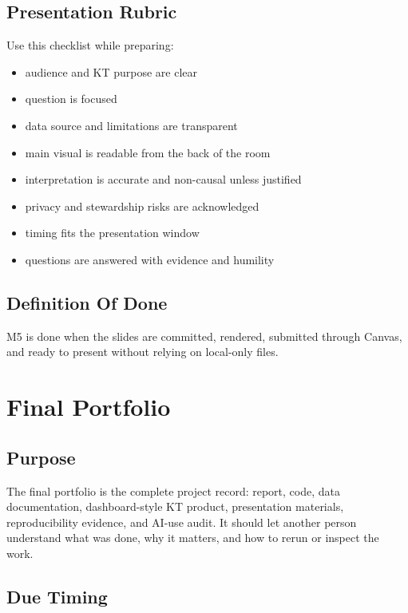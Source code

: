 \documentclass[
  letterpaper,
  DIV=11,
  numbers=noendperiod,
  oneside]{scrreprt}
\providecommand{\tightlist}{%
  \setlength{\itemsep}{0pt}\setlength{\parskip}{0pt}}
\begin{document}
\section{Presentation Rubric}\label{presentation-rubric-1}

Use this checklist while preparing:

\begin{itemize}
\tightlist
\item
  audience and KT purpose are clear
\item
  question is focused
\item
  data source and limitations are transparent
\item
  main visual is readable from the back of the room
\item
  interpretation is accurate and non-causal unless justified
\item
  privacy and stewardship risks are acknowledged
\item
  timing fits the presentation window
\item
  questions are answered with evidence and humility
\end{itemize}

\section{Definition Of Done}\label{definition-of-done-26}

M5 is done when the slides are committed, rendered, submitted through
Canvas, and ready to present without relying on local-only files.

\chapter{Final Portfolio}\label{final-portfolio}

\section{Purpose}\label{purpose-19}

The final portfolio is the complete project record: report, code, data
documentation, dashboard-style KT product, presentation materials,
reproducibility evidence, and AI-use audit. It should let another person
understand what was done, why it matters, and how to rerun or inspect
the work.

\section{Due Timing}\label{due-timing-6}
\end{document}
